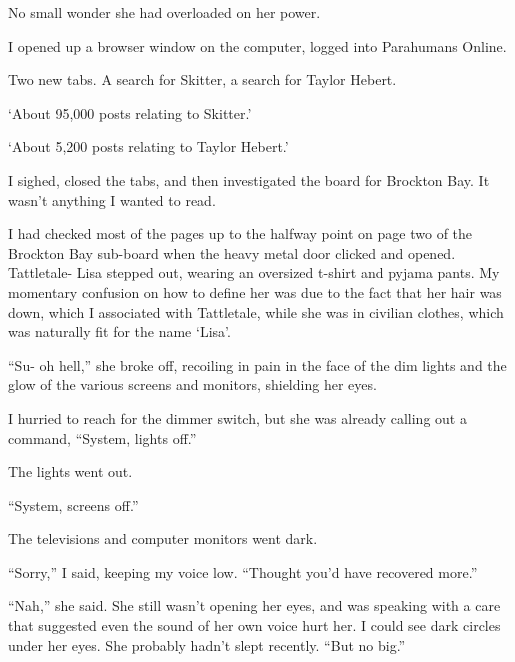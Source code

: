 No small wonder she had overloaded on her power.



I opened up a browser window on the computer, logged into Parahumans Online.



Two new tabs.  A search for Skitter, a search for Taylor Hebert.



`About 95,000 posts relating to Skitter.'



`About 5,200 posts relating to Taylor Hebert.'



I sighed, closed the tabs, and then investigated the board for Brockton Bay.  It wasn't anything I wanted to read.



I had checked most of the pages up to the halfway point on page two of the Brockton Bay sub-board when the heavy metal door clicked and opened.  Tattletale- Lisa stepped out, wearing an oversized t-shirt and pyjama pants.  My momentary confusion on how to define her was due to the fact that her hair was down, which I associated with Tattletale, while she was in civilian clothes, which was naturally fit for the name `Lisa'.



``Su- oh hell,'' she broke off, recoiling in pain in the face of the dim lights and the glow of the various screens and monitors, shielding her eyes.



I hurried to reach for the dimmer switch, but she was already calling out a command, ``System, lights off.''



The lights went out.



``System, screens off.''



The televisions and computer monitors went dark.



``Sorry,'' I said, keeping my voice low.  ``Thought you'd have recovered more.''



``Nah,'' she said.  She still wasn't opening her eyes, and was speaking with a care that suggested even the sound of her own voice hurt her.  I could see dark circles under her eyes.  She probably hadn't slept recently.  ``But no big.''



